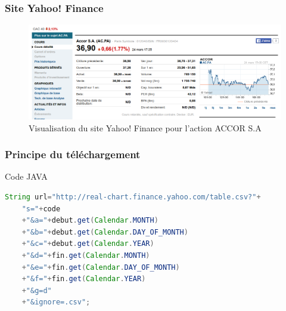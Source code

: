 \begin{frame}
    \frametitle{Site Yahoo! Finance}
    
    	   \begin{figure}[H]
      \center
      \includegraphics[scale=0.30]{images/yahoo.png}
      \caption{Visualisation du site Yahoo! Finance pour l'action ACCOR S.A}
      \end{figure}
    	   
\end{frame}

\begin{frame}[fragile]
    \frametitle{Principe du téléchargement}
    \begin{block}{Code JAVA}
  \begin{lstlisting}[language=JAVA, basicstyle=\scriptsize] 
String url="http://real-chart.finance.yahoo.com/table.csv?"+
	"s="+code  
	+"&a="+debut.get(Calendar.MONTH) 
	+"&b="+debut.get(Calendar.DAY_OF_MONTH) 
	+"&c="+debut.get(Calendar.YEAR) 
	+"&d="+fin.get(Calendar.MONTH)
	+"&e="+fin.get(Calendar.DAY_OF_MONTH)
	+"&f="+fin.get(Calendar.YEAR)
	+"&g=d" 
	+"&ignore=.csv"; 
\end{lstlisting}	  
	\end{block}

\end{frame}
